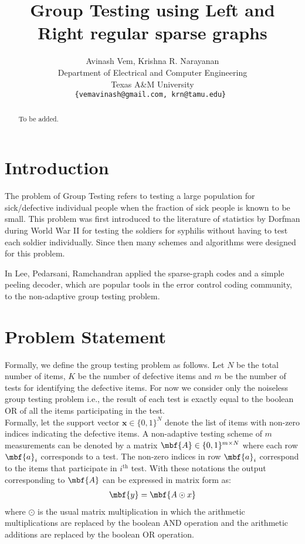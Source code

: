 \documentclass[conference,twocolumn]{IEEEtran}
\begin{document}
\title{Group Testing using Left and Right regular sparse graphs}
\author{Avinash Vem, Krishna R. Narayanan\\
Department of Electrical and Computer Engineering \\
Texas A\&M University\\
{\tt\small {\{vemavinash@gmail.com, krn@tamu.edu\}} }}

\maketitle
\begin{abstract} 
To be added.
\end{abstract}

\section{Introduction}
The problem of Group Testing refers to testing a large population for sick/defective individual people when the fraction of sick people is known to be small. This problem was first introduced to the literature of statistics by Dorfman \cite{dorfman1943detection} during World War II for testing the soldiers for syphilis without having to test each soldier individually. Since then many schemes and algorithms were designed for this problem.

 In \cite{lee2015saffron} Lee, Pedarsani, Ramchandran applied the sparse-graph codes and a simple peeling decoder, which are popular tools in the error control coding community, to the non-adaptive group testing problem. \cite{atia2012boolean,mazumdar2015nonadaptive,lee2015saffron}

\section{Problem Statement}
Formally, we define the group testing problem as follows. Let $N$ be the total number of items, $K$ be the number of defective items and $m$ be the number of tests for identifying the defective items. For now we consider only the noiseless group testing problem i.e., the result of each test is exactly equal to the boolean OR of all the items participating in the test. \\

Formally, let the support vector $\mathbf{x}\in\{0,1\}^{N}$ denote the list of items with non-zero indices indicating the defective items. A non-adaptive testing scheme of $m$ measurements can be denoted by a matrix $\mbf{A}\in\{0,1\}^{m\times N}$ where each row $\mbf{a}_{i}$ corresponds to a test. The non-zero indices in row $\mbf{a}_i$ correspond to the items that participate in $i^{\text{th}}$ test. With these notations the output corresponding to $\mbf{A}$ can be expressed in matrix form as:
\begin{align*}
\mbf{y}=\mbf{A\odot x}
\end{align*}
where $\odot$ is the usual matrix multiplication in which the arithmetic multiplications are replaced by the boolean AND operation and the arithmetic additions are replaced by the boolean OR operation.
\end{document}
